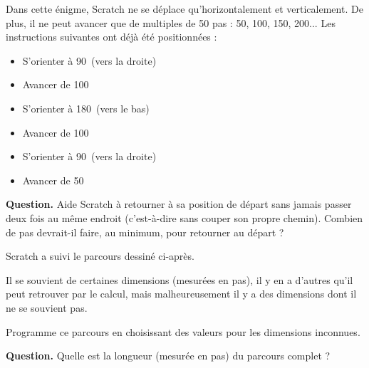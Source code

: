 \documentclass[class=report,crop=false, 12pt]{standalone}
\begin{document}


\begin{enigme}
Dans cette énigme, Scratch ne se déplace qu'horizontalement et verticalement. De plus, il ne peut avancer que de multiples de 50 pas : 50, 100, 150, 200...
Les instructions suivantes ont déjà été positionnées :
\begin{itemize}
  \item S'orienter à 90\textdegree\ (vers la droite)
  \item Avancer de 100
  \item S'orienter à 180\textdegree\  (vers le bas)
  \item Avancer de 100
  \item S'orienter à 90\textdegree\  (vers la droite)
  \item Avancer de 50  
\end{itemize}

\bigskip

\textbf{Question.} Aide Scratch à retourner à sa position de départ sans jamais passer deux fois au même endroit (c'est-à-dire sans couper son propre chemin). Combien de pas devrait-il faire, au minimum, pour retourner au départ ? 




\end{enigme}


\begin{enigme}

  Scratch a suivi le parcours dessiné ci-après.
  
Il se souvient de certaines dimensions (mesurées en pas), il y en a d'autres qu'il peut retrouver par le calcul, mais malheureusement il y a des dimensions dont il ne se souvient pas.

Programme ce parcours en choisissant des valeurs pour les dimensions inconnues.


\bigskip

\textbf{Question.} Quelle est  la longueur (mesurée en pas) du parcours complet ?



\end{enigme}
\end{document}
